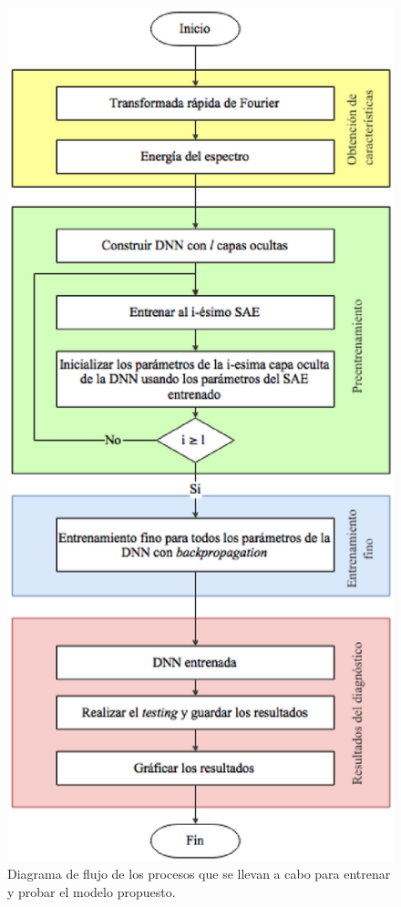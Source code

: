 \documentclass[12pt]{article}%
\begin{document}
\begin{figure}[ht]
  \centering
    \includegraphics[scale=0.7]{./block.eps}
  \caption{Diagrama de flujo de los procesos que se llevan a cabo para entrenar y probar el modelo propuesto.}
  \label{fig:block}
\end{figure}
\end{document}
